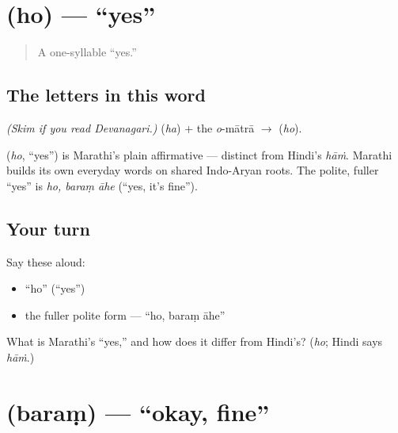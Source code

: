 \section[ho]{ (ho) — \textquotedblleft{}yes\textquotedblright{}}

\label{lesson:MR-C01-ho}



\begin{quote}
A one-syllable \textquotedblleft{}yes.\textquotedblright{}
\end{quote}

\subsection*{The letters in this word}
\emph{(Skim if you read Devanagari.)} \textbf{} (\emph{ha}) + the \emph{o}-mātrā \textbf{} $\to$ \textbf{} (\emph{ho}).

\begin{cousinweb}
\textbf{} (\emph{ho}, \textquotedblleft{}yes\textquotedblright{}) is Marathi's plain affirmative — distinct from Hindi's \emph{hāṁ}. Marathi builds its own everyday words on shared Indo-Aryan roots. The polite, fuller \textquotedblleft{}yes\textquotedblright{} is \emph{ho, baraṃ āhe} (\textquotedblleft{}yes, it's fine\textquotedblright{}).
\end{cousinweb}

\subsection*{Your turn}
Say these aloud:

\begin{itemize}
\raggedright
  \item \textquotedblleft{}ho\textquotedblright{} (\textquotedblleft{}yes\textquotedblright{})
  \item the fuller polite form — \textquotedblleft{}ho, baraṃ āhe\textquotedblright{}
\end{itemize}

\begin{tcolorbox}[breakable,colback=teal!4,colframe=teal!35!black,title={Before you move on}]
What is Marathi's \textquotedblleft{}yes,\textquotedblright{} and how does it differ from Hindi's? (\emph{ho}; Hindi says \emph{hāṁ}.)
\end{tcolorbox}
\section[baram]{ (baraṃ) — \textquotedblleft{}okay, fine\textquotedblright{}}


